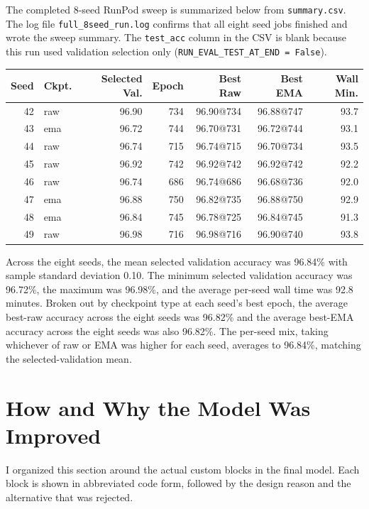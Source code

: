 \documentclass[11pt]{article}
\begin{document}
The completed 8-seed RunPod sweep is summarized below from
\texttt{summary.csv}. The log file \texttt{full\_8seed\_run.log} confirms that all eight
seed jobs finished and wrote the sweep summary. The \texttt{test\_acc} column in the CSV
is blank because this run used validation selection only
(\texttt{RUN\_EVAL\_TEST\_AT\_END = False}).

\begin{center}
\begin{tabular}{rlrrrrr}
\toprule
\textbf{Seed} & \textbf{Ckpt.} & \textbf{Selected Val.} & \textbf{Epoch} &
\textbf{Best Raw} & \textbf{Best EMA} & \textbf{Wall Min.} \\
\midrule
42 & raw & 96.90 & 734 & 96.90@734 & 96.88@747 & 93.7 \\
43 & ema & 96.72 & 744 & 96.70@731 & 96.72@744 & 93.1 \\
44 & raw & 96.74 & 715 & 96.74@715 & 96.70@734 & 93.5 \\
45 & raw & 96.92 & 742 & 96.92@742 & 96.92@742 & 92.2 \\
46 & raw & 96.74 & 686 & 96.74@686 & 96.68@736 & 92.0 \\
47 & ema & 96.88 & 750 & 96.82@735 & 96.88@750 & 92.9 \\
48 & ema & 96.84 & 745 & 96.78@725 & 96.84@745 & 91.3 \\
49 & raw & 96.98 & 716 & 96.98@716 & 96.90@740 & 93.8 \\
\bottomrule
\end{tabular}
\end{center}

Across the eight seeds, the mean selected validation accuracy was 96.84\% with sample
standard deviation 0.10. The minimum selected validation accuracy was 96.72\%, the
maximum was 96.98\%, and the average per-seed wall time was 92.8 minutes. Broken out
by checkpoint type at each seed's best epoch, the average best-raw accuracy across the
eight seeds was 96.82\% and the average best-EMA accuracy across the eight seeds was
also 96.82\%. The per-seed mix, taking whichever of raw or EMA was higher for each
seed, averages to 96.84\%, matching the selected-validation mean.

\clearpage
\section{How and Why the Model Was Improved}

I organized this section around the actual custom blocks in the final model. Each
block is shown in abbreviated code form, followed by the design reason and the alternative
that was rejected.
\end{document}
